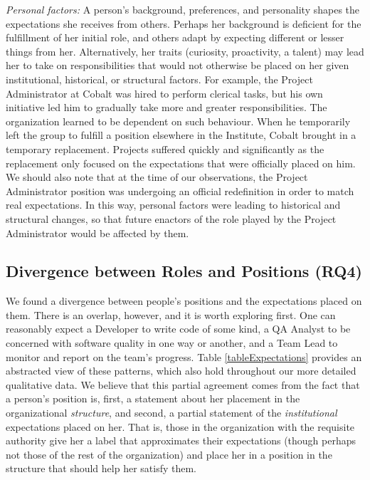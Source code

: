 \documentclass[10pt, conference, compsocconf]{IEEEtran}
\begin{document}
\emph{Personal factors:} A person's background, preferences, and personality shapes the expectations she receives from others. Perhaps her background is deficient for the fulfillment of her initial role, and others adapt by expecting different or lesser things from her. Alternatively, her traits (curiosity, proactivity, a talent) may lead her to take on responsibilities that would not otherwise be placed on her given institutional, historical, or structural factors. For example, the Project Administrator at Cobalt was hired to perform clerical tasks, but his own initiative led him to gradually take more and greater responsibilities. The organization learned to be dependent on such behaviour. When he temporarily left the group to fulfill a position elsewhere in the Institute, Cobalt brought in a temporary replacement. Projects suffered quickly and significantly as the replacement only focused on the expectations that were officially placed on him. We should also note that at the time of our observations, the Project Administrator position was undergoing an official redefinition in order to match real expectations. In this way, personal factors were leading to historical and structural changes, so that future enactors of the role played by the Project Administrator would be affected by them.


\subsection{Divergence between Roles and Positions (RQ4)}

We found a divergence between people's positions and the expectations placed on them. There is an overlap, however, and it is worth exploring first. One can reasonably expect a Developer to write code of some kind, a QA Analyst to be concerned with software quality in one way or another, and a Team Lead to monitor and report on the team's progress. Table \ref{tableExpectations} provides an abstracted view of these patterns, which also hold throughout our more detailed qualitative data. We believe that this partial agreement comes from the fact that a person's position is, first, a statement about her placement in the organizational \emph{structure}, and second, a partial statement of the \emph{institutional} expectations placed on her. That is, those in the organization with the requisite authority give her a label that approximates their expectations (though perhaps not those of the rest of the organization) and place her in a position in the structure that should help her satisfy them.
\end{document}
